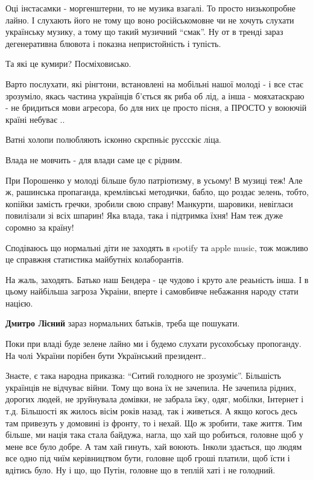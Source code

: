 \begin{itemize}
Оці інстасамки - моргенштерни, то не музика взагалі. То просто низькопробне
лайно. І слухають його не тому що воно російськомовне чи не хочуть слухати
українську музику, а тому що такий музичний \enquote{смак}. Ну от в тренді зараз
дегенеративна блювота і показна непристойність і тупість.

Та які це кумири? Посміховисько.


Варто послухати, які рінгтони, встановлені на мобільні нашої молоді - і все
стає зрозуміло, якась частина українців б'ється як риба об лід, а інша -
мояхатаскраю - не бридиться мови агресора, бо для них це просто пісня, а ПРОСТО
у воюючій країні небуває ..

Ватні холопи полюбляють ісконно скрєпньіє руссскіє ліца.

Влада не мовчить - для влади саме це є рідним.


При Порошенко у молоді більше було патріотизму, в усьому! В музиці теж! Але
ж, рашинська пропаганда, кремлівські методички, бабло, що роздає
зелень, тобто, копійки замість гречки, зробили свою
справу! Манкурти, шаровики, невігласи повилізали зі всіх шпарин! Яка влада, така і
підтримка їхня! Нам теж дуже соромно за країну!



Сподіваюсь що нормальні діти не заходять в spotify та apple music, тож можливо
це справжня статистика майбутніх колаборантів.

\begin{itemize} %

На жаль, заходять. Батько наш Бендера - це чудово і круто але реаьність інша. І
в цьому найбільша загроза Украіни, вперте і самовбивче небажання народу стати
нацією.

\textbf{Дмитро Лісний} зараз нормальних батьків, треба ще пошукати.
\end{itemize} %


Поки при владі буде зелене лайно ми і будемо слухати русохобську пропоганду. На
чолі України порібен бути Український президент..


Знаєте, є така народна приказка: \enquote{Ситий голодного не зрозуміє}. Більшість
українців не відчуває війни. Тому що вона їх не зачепила. Не зачепила рідних,
дорогих людей, не зруйнувала домівки, не забрала їжу, одяг, мобілки, Інтернет і
т.д. Більшості як жилось вісім років назад, так і живеться. А якщо когось десь
там привезуть у домовині із фронту, то і нехай. Що ж зробити, таке життя. Тим
більше, ми нація така стала байдужа, нагла, що хай що робиться, головне щоб у
мене все було добре. А там хай гинуть, хай воюють. Інколи здається, що людям
все одно під чиїм керівництвом бути, головне щоб гроші платили, щоб їсти і
вдітись було. Ну і що, що Путін, головне що в теплій хаті і не голодний.


\end{itemize}
